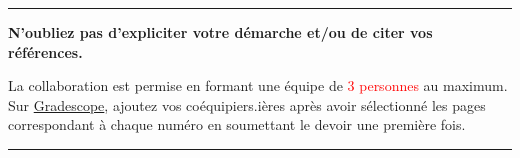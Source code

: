 \documentclass[english,french,12pt]{article}
\begin{document}
\vfill
\hrule
\vspace{0.3em}
\centering
\textbf{N'oubliez pas d'expliciter votre démarche et/ou de citer vos références.}\par
\vspace{-0.3em}
La collaboration est permise en formant une équipe de \textcolor{red}{3 personnes} au maximum. Sur \href{https://www.gradescope.com/}{Gradescope}, ajoutez vos coéquipiers.ières après avoir sélectionné les pages correspondant à chaque numéro en soumettant le devoir une première fois.\par
\vspace{1em}
\hrule
\end{document}
